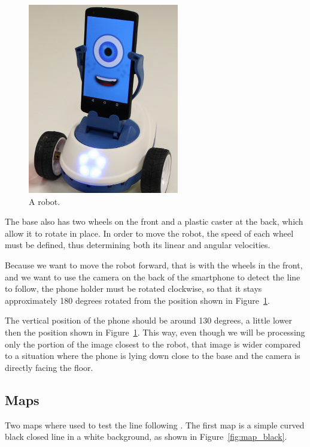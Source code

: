 \documentclass[10pt,conference,compsoc]{IEEEtran}
\begin{document}
\begin{figure}[thpb]
\centering
\includegraphics[scale=0.5]{img/robobo.png}
\caption{A \robobo robot.}
\label{fig:robobo}
\end{figure}

The base also has two wheels on the front and a plastic caster at the back, which allow it to rotate in place. In order to move the robot, the speed of each wheel must be defined, thus determining both its linear and angular velocities.

Because we want to move the robot forward, that is with the wheels in the front, and we want to use the camera on the back of the smartphone to detect the line to follow, the phone holder must be rotated clockwise, so that it stays approximately 180 degrees rotated from the position shown in Figure~\ref{fig:robobo}.

The vertical position of the phone should be around 130 degrees, a little lower then the position shown in Figure~\ref{fig:robobo}. This way, even though we will be processing only the portion of the image closest to the robot, that image is wider compared to a situation where the phone is lying down close to the base and the camera is directly facing the floor.

\subsection{Maps}
Two maps where used to test the line following \robobo. The first map is a simple curved black closed line in a white background, as shown in Figure~\ref{fig:map_black}.
\end{document}
